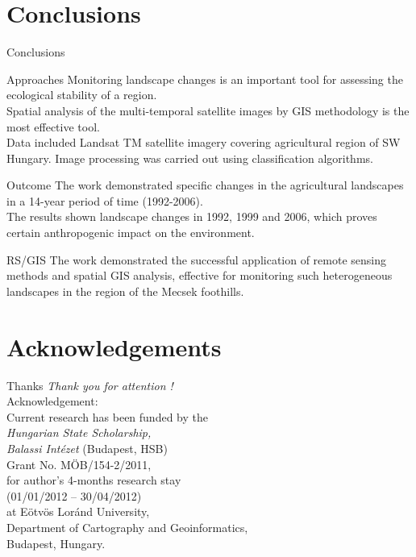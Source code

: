 \documentclass[pdflatex,compress,10pt,
	xcolor={dvipsnames,dvipsnames,svgnames,x11names,table},
	hyperref={
	breaklinks = true, 
	pdfauthor={Lemenkova Polina}, 
	pdfsubject={Preentation}, 
	pdfcreator={Lemenkova Polina}, 
	pdfproducer={Lemenkova Polina}, 
	citecolor=NavyBlue, 
	urlcolor = NavyBlue, 
	breaklinks = true}]{beamer}
\begin{document}
\section{Conclusions}
\begin{frame}{Conclusions}

\begin{alertblock}{Approaches}
Monitoring landscape changes is an important tool for assessing the ecological stability of a region.\\
\alert{Spatial analysis} of the multi-temporal satellite images by GIS methodology is the most effective tool. \\
\alert{Data} included Landsat TM satellite imagery covering agricultural region of SW Hungary. Image processing was carried out using classification algorithms.
\end{alertblock}

\begin{block}{Outcome}
The work demonstrated specific changes in the agricultural landscapes in a 14-year period of time (1992-2006).\\
The results shown landscape changes in 1992, 1999 and 2006, which proves certain anthropogenic impact on the environment.
\end{block}

\begin{block}{RS/GIS}
The work demonstrated the successful application of remote sensing methods and spatial GIS analysis, effective for monitoring such heterogeneous landscapes in the region of the Mecsek foothills.
\end{block}

\end{frame}

\section{Acknowledgements}
\begin{frame}{Thanks}
  	\centering \Large 
  	\emph{Thank you for attention !}\\
	\vspace{5em}
\normalsize
Acknowledgement: \\\vspace{1em}
Current research has been funded by the \\
\emph{Hungarian State Scholarship, \\
Balassi Int\'{e}zet} (Budapest, HSB) \\
Grant No. M\"{O}B/154-2/2011, \\
for author's 4-months research stay \\
(01/01/2012 -- 30/04/2012)\\
at E\"{o}tv\"{o}s Lor\'{a}nd University, \\
Department of Cartography and Geoinformatics, \\
Budapest, Hungary.
\end{frame}
\end{document}
